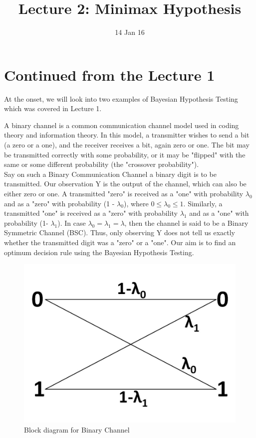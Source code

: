 \documentclass[a4paper,english,12pt]{article}
\title{Lecture 2: Minimax Hypothesis}
\date{14 Jan 16}
\begin{document}
\maketitle

\section{Continued from the Lecture 1}
At the onset, we will look into two examples of Bayesian Hypothesis Testing which was covered in Lecture 1.  

\begin{exmp} 
A binary channel is a common communication channel model used in coding theory and information theory. In this model, a transmitter wishes to send a bit (a zero or a one), and the receiver receives a bit, again zero or one. The bit may be transmitted correctly with some probability, or it may be "flipped" with the same or some different probability (the "crossover probability").\\ 
Say on such a Binary Communication Channel a binary digit is to be transmitted. Our observation Y is the output of the channel, which can also be either zero or one. A transmitted "zero" is received as a "one" with probability $\lambda_0$ and as a "zero" with probability (1 - $\lambda_0$), where $0 \leq \lambda_0 \leq 1$. Similarly, a transmitted "one" is received as a "zero" with probability $\lambda_1$ and as a "one" with probability (1- $\lambda_1$). In case $\lambda_0=\lambda_1=\lambda$, then the channel is said to be a Binary Symmetric Channel (BSC). Thus, only observing Y does not tell us exactly whether the transmitted digit was a "zero" or a "one". Our aim is to find an optimum decision rule using the Bayesian Hypothesis Testing.

\begin{figure}[h]
\centering
\includegraphics[width=0.7\linewidth]{Figures/bsc1}
\caption{Block diagram for Binary Channel}
\label{fig:bsc1}
\end{figure}


\end{exmp}
\end{document}
